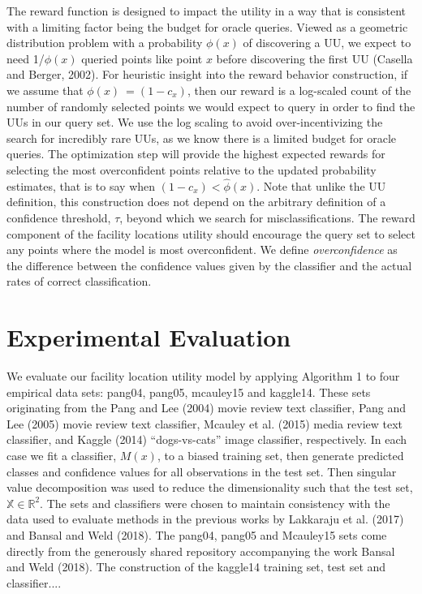 \documentclass[letterpaper]{article} %
\newcommand{\km}[1]{{\color{red} #1}} %
\begin{document}
The reward function is designed to impact the utility in a way that is consistent with a limiting factor being the budget for oracle queries. Viewed as a geometric distribution problem with a probability $\phi(x)$ of discovering a UU, we expect to need 1/$\phi(x)$ queried points like point $x$ before discovering the first UU \km{(Casella and Berger, 2002)}. For heuristic insight into the reward behavior construction, if we assume that   $\phi(x) ~= (1-c_x )$, then our reward is a log-scaled count of the number of randomly selected points we would expect to query in order to find the UUs in our query set. We use the log scaling to avoid over-incentivizing the search for incredibly rare UUs, as we know there is a limited budget for oracle queries. The optimization step will provide the highest expected rewards for selecting the most overconfident points relative to the updated probability estimates, that is to say when $(1-c_x )< \hat{\phi}(x)$. Note that unlike the UU definition, this construction does not depend on the arbitrary definition of a confidence threshold, $\tau$, beyond which we search for misclassifications. The reward component of the facility locations utility should encourage the query set to select any points where the model is most overconfident. We define \textit{overconfidence} as the difference between the confidence values given by the classifier and the actual rates of correct classification. 


\section{Experimental Evaluation}

We evaluate our facility location utility model by applying Algorithm 1 to four empirical data sets: pang04, pang05, mcauley15 and kaggle14. These sets originating from the \km{Pang and Lee (2004) movie review text classifier, Pang and Lee (2005) movie review text classifier, Mcauley et al. (2015) media review text classifier, and Kaggle (2014) “dogs-vs-cats” image classifier}, respectively. In each case we fit a classifier, $M(x)$, to a biased training set, then generate predicted classes and confidence values for all observations in the test set. Then singular value decomposition was used to reduce the dimensionality such that the test set, $\mathbb{X} \in \mathbb{R}^2$. The sets and classifiers were chosen to maintain consistency with the data used to evaluate methods in the previous works by Lakkaraju et al. (2017) and Bansal and Weld (2018). The pang04, pang05 and Mcauley15 sets come directly from the generously shared repository accompanying the work Bansal and Weld (2018). \km{The construction of the kaggle14 training set, test set and classifier....}
\end{document}
